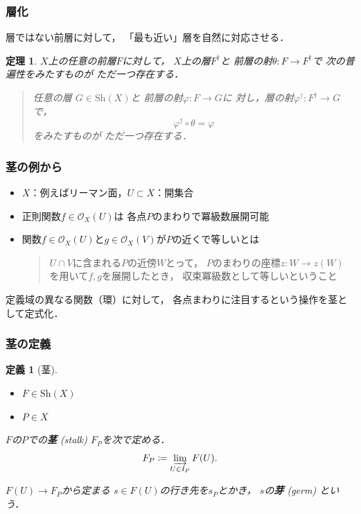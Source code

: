 \documentclass[dvipdfmx,10pt,aspectratio=169,leqno]{beamer}%
\newcommand{\mcal}{\mathcal}
\numberwithin{equation}{subsection}
\newcommand{\OO}{\mcal{O}}
\newcommand{\Sh}{\mathrm{Sh}}
\theoremstyle{mystyle}
\newtheorem{DFN}[AXM]{定義}
\newtheorem{THM}[AXM]{定理}
\begin{document}
\begin{frame}
    \frametitle{層化}
    層ではない前層に対して，
    「最も近い」層を自然に対応させる．
    \begin{THM}\label{thm:sheafification}
        \(X\)上の任意の前層\(F\)に対して，
        \(X\)上の層\(F^\dagger\)と
        前層の射\(\theta\colon F\to F^\dagger\)で
        次の普遍性をみたすものが
        ただ一つ存在する．
        \begin{quote}
            任意の層 \({G}\in\Sh(X)\)と
            前層の射\(\varphi\colon F\to{G}\)に
            対し，層の射\(\varphi^\dagger\colon F^\dagger
            \to{G}\)で，
            \[\varphi^\dagger\circ \theta=\varphi\]をみたすものが
            ただ一つ存在する．
        \end{quote}
    \end{THM}    
\end{frame}

\begin{frame}
    \frametitle{茎の例から}
    \begin{itemize}
        \item \(X\)：例えばリーマン面，\(U\subset X\)：開集合
        \item 正則関数\(f\in\OO_{X}(U)\)は
        各点\(P\)のまわりで冪級数展開可能
        \item 関数\(f\in \mathscr{O}_X(U)\)と\(g\in \mathscr{O}_X(V)\)が\(P\)の近くで等しいとは
        
        \begin{quote}
            \(U\cap V\)に含まれる\(P\)の近傍\(W\)とって，
            \(P\)のまわりの座標\(z\colon W\to z(W)\)
            を用いて\(f,g\)を展開したとき，
            収束冪級数として等しいということ
        \end{quote}
    \end{itemize}

定義域の異なる関数（環）に対して，
各点まわりに注目するという操作を茎として定式化．

\end{frame}

\begin{frame}
    \frametitle{茎の定義}
    \begin{DFN}[茎]
        \begin{itemize}
            \item \(F\in\Sh(X)\)
            \item \(P\in X\)
        \end{itemize}
        \(F\)の\(P\)での\textbf{茎} (stalk) \(
            F_P
        \)を次で定める．
        \[
            F_P\coloneqq
            \varinjlim_{U\in I_P}F(U).
        \]
    
        \(F(U)\to F_P\)から定まる
        \(s\in F(U)\)の行き先を\(s_P\)とかき，
        \(s\)の\textbf{芽} (germ) という．
    \end{DFN}
\end{frame}
\end{document}
